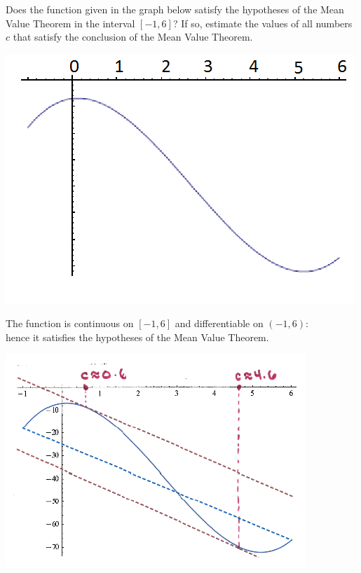\documentclass[nooutcomes,handout]{ximera}
\begin{document}
\begin{problem}
  Does the function given in the graph below satisfy the hypotheses of the Mean Value Theorem in the interval $[-1,6]$?
  If so, estimate the values of all numbers $c$ that satisfy the conclusion of the Mean Value Theorem.  
  \begin{image}
    \includegraphics[scale=0.65]{Images/figure1.png}
  \end{image}
  \begin{freeResponse}
    The function is continuous on $[-1,6]$ and differentiable on $(-1,6)$: \\
    hence it satisfies the hypotheses of the Mean Value Theorem.
    \begin{image}
      \includegraphics[scale=0.6]{Images/Figure2.png}
    \end{image}
  \end{freeResponse}
\end{problem}
\end{document}
